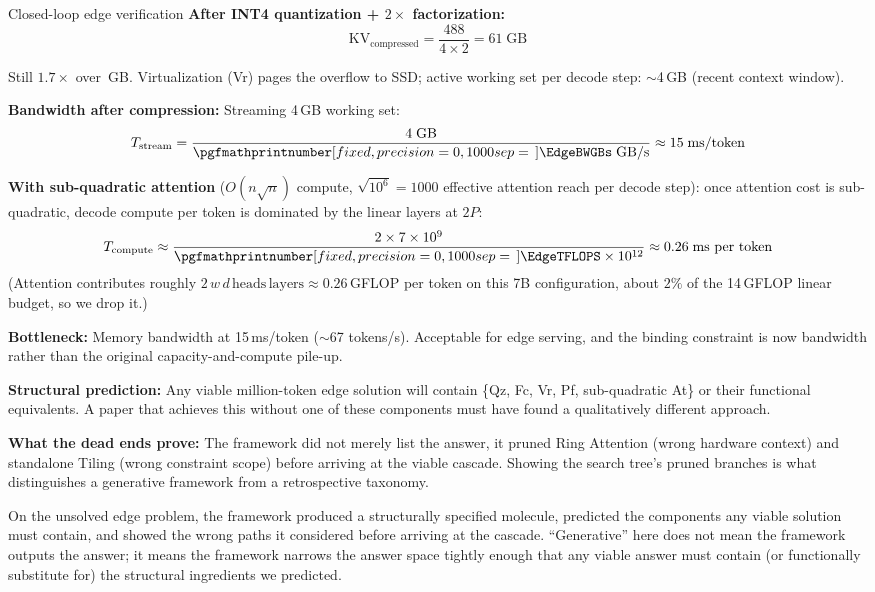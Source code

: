 \documentclass[10pt,twocolumn]{article}
\newcommand{\cvalint}[1]{\pgfmathprintnumber[fixed, precision=0, 1000 sep={\,}]{#1}}
\newcommand{\EdgeKVTotalGB}{488}  %
\begin{document}
\begin{napkinmath}{Closed-loop edge verification}
\textbf{After INT4 quantization + $2\times$ factorization:}
\[
\text{KV}_{\text{compressed}} = \frac{\EdgeKVTotalGB{}}{4 \times 2} = 61\;\text{GB}
\]

Still $1.7\times$ over \cvalint{\EdgeRAMGB}\,GB. Virtualization (Vr) pages the overflow to SSD; active working set per decode step: ${\sim}$4\,GB (recent context window).

\textbf{Bandwidth after compression:} Streaming 4\,GB working set:
\[
T_{\text{stream}} = \frac{4\;\text{GB}}{\cvalint{\EdgeBWGBs}\;\text{GB/s}} \approx 15\;\text{ms/token}
\]

\textbf{With sub-quadratic attention} ($O(n\sqrt{n})$ compute, $\sqrt{10^6} = 1000$ effective attention reach per decode step): once attention cost is sub-quadratic, decode compute per token is dominated by the linear layers at $2P$:
\[
T_{\text{compute}} \approx \frac{2 \times 7 \times 10^9}{\cvalint{\EdgeTFLOPS} \times 10^{12}} \approx 0.26\;\text{ms per token}
\]
(Attention contributes roughly $2\, w\, d\, \text{heads}\, \text{layers} \approx 0.26$\,GFLOP per token on this 7B configuration, about $2\%$ of the 14\,GFLOP linear budget, so we drop it.)

\textbf{Bottleneck:} Memory bandwidth at 15\,ms/token ($\sim$67 tokens/s). Acceptable for edge serving, and the binding constraint is now bandwidth rather than the original capacity-and-compute pile-up.

\textbf{Structural prediction:} Any viable million-token edge solution will contain \{Qz, Fc, Vr, Pf, sub-quadratic At\} or their functional equivalents. A paper that achieves this without one of these components must have found a qualitatively different approach.

\textbf{What the dead ends prove:} The framework did not merely list the answer, it pruned Ring Attention (wrong hardware context) and standalone Tiling (wrong constraint scope) before arriving at the viable cascade. Showing the search tree's pruned branches is what distinguishes a generative framework from a retrospective taxonomy.
\end{napkinmath}

On the unsolved edge problem, the framework produced a structurally specified molecule, predicted the components any viable solution must contain, and showed the wrong paths it considered before arriving at the cascade. ``Generative'' here does not mean the framework outputs the answer; it means the framework narrows the answer space tightly enough that any viable answer must contain (or functionally substitute for) the structural ingredients we predicted.
\end{document}
